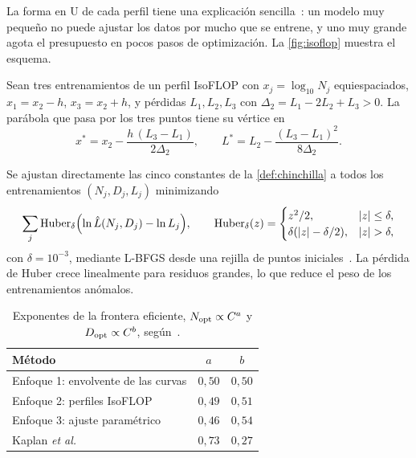 La forma en U de cada perfil tiene una explicación sencilla~\cite[§2.1]{cs336a3}: un modelo muy pequeño no puede ajustar los datos por mucho que se entrene, y uno muy grande agota el presupuesto en pocos pasos de optimización. La \cref{fig:isoflop} muestra el esquema.

\addtocounter{figure}{1}%

\begin{proposicion}\label{prop:vertice}
Sean tres entrenamientos de un perfil IsoFLOP con $x_j=\log_{10}N_j$ equiespaciados, $x_1=x_2-h$, $x_3=x_2+h$, y pérdidas $L_1,L_2,L_3$ con $\Delta_2=L_1-2L_2+L_3>0$. La parábola que pasa por los tres puntos tiene su vértice en
\[
x^{*}=x_2-\frac{h\,(L_3-L_1)}{2\Delta_2},\qquad L^{*}=L_2-\frac{(L_3-L_1)^{2}}{8\Delta_2}.
\]
\end{proposicion}

\begin{definicion}
Se ajustan directamente las cinco constantes de la \cref{def:chinchilla} a todos los entrenamientos $(N_j,D_j,L_j)$ minimizando
\[
\sum_j\mathrm{Huber}_\delta\Bigl(\ln\hat L(N_j,D_j)-\ln L_j\Bigr),\qquad
\mathrm{Huber}_\delta(z)=\begin{cases}z^{2}/2,&\lvert z\rvert\le\delta,\\ \delta(\lvert z\rvert-\delta/2),&\lvert z\rvert>\delta,\end{cases}
\]
con $\delta=10^{-3}$, mediante L-BFGS desde una rejilla de puntos iniciales~\cite[§3.3]{hoffmann}. La pérdida de Huber crece linealmente para residuos grandes, lo que reduce el peso de los entrenamientos anómalos.
\end{definicion}

\begin{table}[h]
\centering\small
\caption{Exponentes de la frontera eficiente, $N_{\mathrm{opt}}\propto C^{a}$ y $D_{\mathrm{opt}}\propto C^{b}$, según~\cite[tabla~2]{hoffmann}.}\label{tab:exponentes}
\begin{tabular}{@{}lcc@{}}
\toprule
Método & $a$ & $b$ \\
\midrule
Enfoque 1: envolvente de las curvas & $0{,}50$ & $0{,}50$ \\
Enfoque 2: perfiles IsoFLOP & $0{,}49$ & $0{,}51$ \\
Enfoque 3: ajuste paramétrico & $0{,}46$ & $0{,}54$ \\
Kaplan \emph{et al.}~\cite{kaplan} & $0{,}73$ & $0{,}27$ \\
\bottomrule
\end{tabular}
\end{table}

